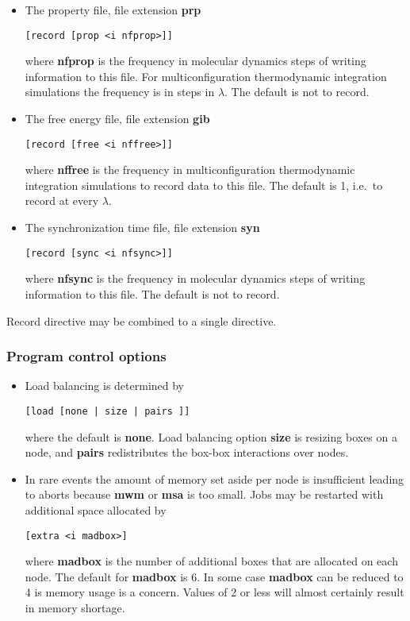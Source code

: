 \begin{itemize}
thermodynamic integration simulations the frequency is in
steps in $\lambda$. The default is not to record.
\item
The property file, file extension {\bf prp}
\begin{verbatim}
[record [prop <i nfprop>]]
\end{verbatim}
where {\bf nfprop} is the frequency in molecular dynamics steps
of writing information to this file. For multiconfiguration
thermodynamic integration simulations the frequency is in
steps in $\lambda$. The default is not to record.
\item
The free energy file, file extension {\bf gib}
\begin{verbatim}
[record [free <i nffree>]]
\end{verbatim}
where {\bf nffree} is the frequency in multiconfiguration
thermodynamic integration simulations to record data to this file.
The default is 1, i.e.\ to record at every $\lambda$.
\item
The synchronization time file, file extension {\bf syn}
\begin{verbatim}
[record [sync <i nfsync>]]
\end{verbatim}
where {\bf nfsync} is the frequency in molecular dynamics steps
of writing information to this file. The default is not to record.
\end{itemize}
Record directive may be combined to a single directive.
\subsubsection{Program control options}
\begin{itemize}
\item
Load balancing is determined by
\begin{verbatim}
[load [none | size | pairs ]]
\end{verbatim}
where the default is {\bf none}. Load balancing option {\bf size}
is resizing boxes on a node, and {\bf pairs} redistributes the
box-box interactions over nodes.
\item
In rare events the amount of memory set aside per node is insufficient
leading to aborts because {\bf mwm} or {\bf msa} is too small. Jobs
may be restarted with additional space allocated by
\begin{verbatim}
[extra <i madbox>]
\end{verbatim}
where {\bf madbox} is the number of additional boxes that are allocated
on each node. The default for {\bf madbox} is 6. In some case {\bf madbox}
can be reduced to 4 is memory usage is a concern. Values of 2 or less
will almost certainly result in memory shortage.
\end{itemize}
